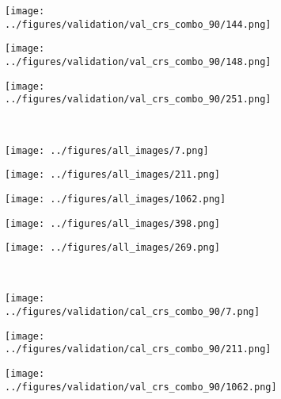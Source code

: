 \begin{figure}[h!]
\begin{subfigure}{0.19\textwidth}
		\centering
		\texttt{[image: ../figures/validation/val\_crs\_combo\_90/144.png]}
		\label{fig:1}
	\end{subfigure}
	\begin{subfigure}{0.19\textwidth}
		\centering
		\texttt{[image: ../figures/validation/val\_crs\_combo\_90/148.png]}
		\label{fig:1}
	\end{subfigure}
	\begin{subfigure}{0.19\textwidth}
		\centering
		\texttt{[image: ../figures/validation/val\_crs\_combo\_90/251.png]}
		\label{fig:1}
	\end{subfigure}
	\vspace{-0.35cm}
	\\
		\begin{subfigure}{0.19\textwidth}
		\centering
		\texttt{[image: ../figures/all\_images/7.png]}
		\label{fig:1}
	\end{subfigure}
	\begin{subfigure}{0.19\textwidth}
		\centering
		\texttt{[image: ../figures/all\_images/211.png]}
		\label{fig:1}
	\end{subfigure}
	\begin{subfigure}{0.19\textwidth}
		\centering
		\texttt{[image: ../figures/all\_images/1062.png]}
		\label{fig:1}
	\end{subfigure}
	\begin{subfigure}{0.19\textwidth}
		\centering
		\texttt{[image: ../figures/all\_images/398.png]}
		\label{fig:1}
	\end{subfigure}
	\begin{subfigure}{0.19\textwidth}
		\centering
		\texttt{[image: ../figures/all\_images/269.png]}
		\label{fig:1}
	\end{subfigure}
	\vspace{-0.35cm}
	\\
	\begin{subfigure}{0.19\textwidth}
		\centering
		\texttt{[image: ../figures/validation/cal\_crs\_combo\_90/7.png]}
		\label{fig:1}
	\end{subfigure}
	\begin{subfigure}{0.19\textwidth}
		\centering
		\texttt{[image: ../figures/validation/cal\_crs\_combo\_90/211.png]}
		\label{fig:1}
	\end{subfigure}
	\begin{subfigure}{0.19\textwidth}
		\centering
		\texttt{[image: ../figures/validation/val\_crs\_combo\_90/1062.png]}

\end{subfigure}
\end{figure}
